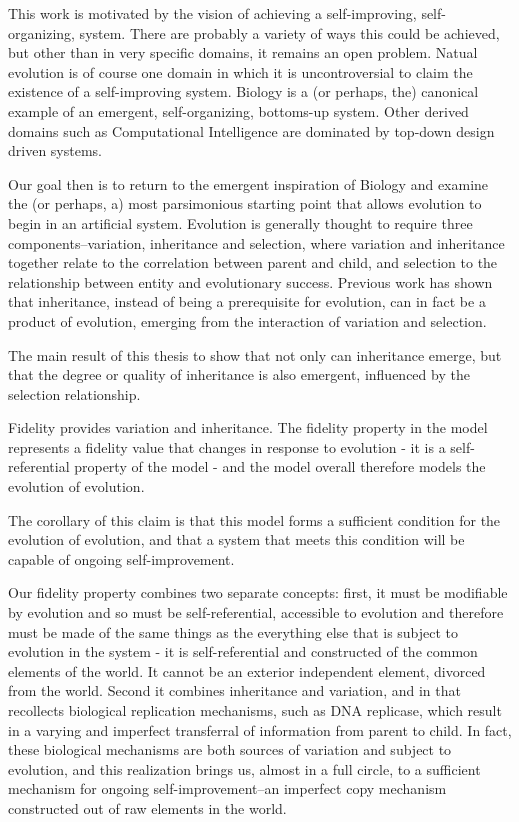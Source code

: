 \documentclass[]{report}
\title{}
\author{}
\begin{document}
This work is motivated by the vision of achieving a self-improving, self-organizing, system. There are probably a variety of ways this could be achieved, but other than in very specific domains, it remains an open problem. Natual evolution is of course one domain in which it is uncontroversial to claim the existence of a self-improving system. Biology is a (or perhaps, the) canonical example of an emergent, self-organizing, bottoms-up system. Other derived domains such as Computational Intelligence are dominated by top-down design driven systems.

Our goal then is to return to the emergent inspiration of Biology and examine the (or perhaps, a) most parsimonious starting point that allows evolution to begin in an artificial system. Evolution is generally thought to require three components--variation, inheritance and selection, where variation and inheritance together relate to the correlation between parent and child, and selection to the relationship between entity and evolutionary success. Previous work has shown that inheritance, instead of being a prerequisite for evolution, can in fact be a product of evolution, emerging from the interaction of variation and selection.

The main result of this thesis to show that not only can inheritance emerge, but that the degree or quality of inheritance is also emergent, influenced by the selection relationship. 

Fidelity provides variation and inheritance. The fidelity property in the model represents a fidelity value that changes in response to evolution - it is a self-referential property of the model - and the model overall therefore models the evolution of evolution.

The corollary of this claim is that this model forms a sufficient condition for the evolution of evolution, and that a system that meets this condition will be capable of ongoing self-improvement. 

Our fidelity property combines two separate concepts: first, it must be modifiable by evolution and so must be self-referential, accessible to evolution and therefore must be made of the same things as the everything else that is subject to evolution in the system - it is self-referential and constructed of the common elements of the world. It cannot be an exterior independent element, divorced from the world. Second it combines inheritance and variation, and in that recollects biological replication mechanisms, such as DNA replicase, which result in a varying and imperfect transferral of information from parent to child. In fact, these biological mechanisms are both sources of variation and subject to evolution, and this realization brings us, almost in a full circle, to a sufficient mechanism for ongoing self-improvement--an imperfect copy mechanism constructed out of raw elements in the world.
\end{document}

